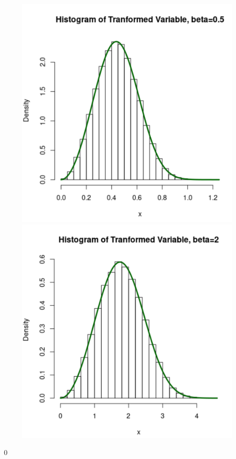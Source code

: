 \documentclass{book}
\theoremstyle{definition}
\begin{document}
\newpage

\begin{figure}[!htb]
	\centering
	\includegraphics[scale=0.5]{beta-0-5}
	\includegraphics[scale=0.5]{beta-2}
\end{figure}\qed
\end{document}
